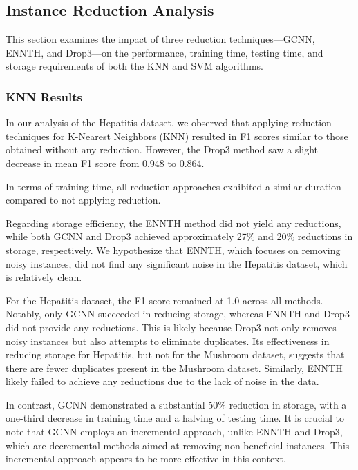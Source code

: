 \subsection{Instance Reduction Analysis}
\label{subsubsec:discussion-reduction}

This section examines the impact of three reduction techniques—GCNN, ENNTH, and Drop3—on the performance, training time, testing time, and storage requirements of both the KNN and SVM algorithms.

\subsubsection{KNN Results}
In our analysis of the Hepatitis dataset, we observed that applying reduction techniques
for K-Nearest Neighbors (KNN) resulted in F1 scores similar to those obtained without any reduction.
However, the Drop3 method saw a slight decrease in mean F1 score from 0.948 to 0.864. 

In terms of training time, all reduction approaches exhibited a similar duration compared to not applying reduction.

Regarding storage efficiency, the ENNTH method did not yield any reductions, while both GCNN and Drop3 achieved approximately
27\% and 20\% reductions in storage, respectively. We hypothesize that ENNTH, which focuses on removing noisy instances, did not
find any significant noise in the Hepatitis dataset, which is relatively clean.

For the Hepatitis dataset, the F1 score remained at 1.0 across all methods. Notably, only GCNN succeeded in reducing storage,
whereas ENNTH and Drop3 did not provide any reductions. This is likely because Drop3 not only removes noisy instances but also
attempts to eliminate duplicates. Its effectiveness in reducing storage for Hepatitis, but not for the Mushroom dataset, suggests
that there are fewer duplicates present in the Mushroom dataset. Similarly, ENNTH likely failed to achieve any reductions due to the lack of noise in the data.

In contrast, GCNN demonstrated a substantial 50\% reduction in storage, with a one-third decrease in training time and a halving of testing time. It is crucial to note that GCNN employs an incremental approach, unlike ENNTH and Drop3, which are decremental methods aimed at removing non-beneficial instances. This incremental approach appears to be more effective in this context.

